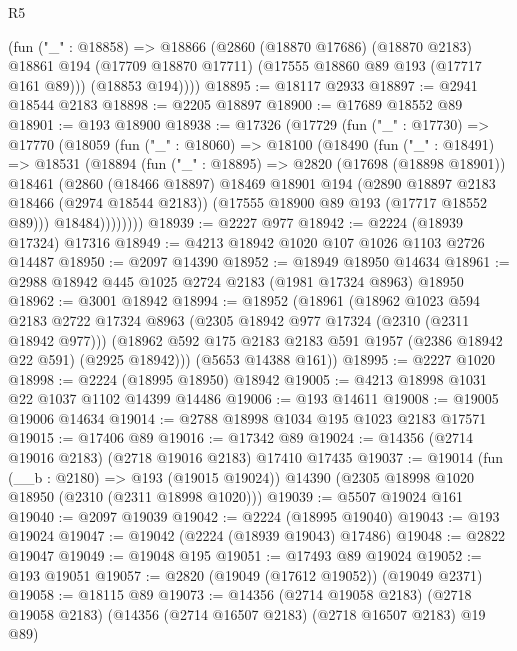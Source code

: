 \begin{lexlean}{R5}
\begin{coremodule}
        (fun ("_" : @18858) =>
        @18866
          (@2860
            (@18870 @17686)
            (@18870 @2183)
            @18861
            @194
            (@17709 @18870 @17711)
            (@17555 @18860 @89 @193 (@17717 @161 @89)))
          (@18853 @194))))
@18895 := @18117 @2933
@18897 := @2941 @18544 @2183
@18898 := @2205 @18897
@18900 := @17689 @18552 @89
@18901 := @193 @18900
@18938 := @17326
    (@17729
      (fun ("_" : @17730) =>
      @17770
        (@18059
          (fun ("_" : @18060) =>
          @18100
            (@18490
              (fun ("_" : @18491) =>
              @18531
                (@18894
                  (fun ("_" : @18895) =>
                  @2820
                    (@17698 (@18898 @18901))
                    @18461
                    (@2860
                      (@18466 @18897)
                      @18469
                      @18901
                      @194
                      (@2890 @18897 @2183 @18466 (@2974 @18544 @2183))
                      (@17555 @18900 @89 @193 (@17717 @18552 @89)))
                    @18484))))))))
@18939 := @2227 @977
@18942 := @2224 (@18939 @17324) @17316
@18949 := @4213 @18942 @1020 @107 @1026 @1103 @2726 @14487
@18950 := @2097 @14390
@18952 := @18949 @18950 @14634
@18961 := @2988 @18942 @445 @1025 @2724 @2183 (@1981 @17324 @8963) @18950
@18962 := @3001 @18942
@18994 := @18952
    (@18961
      (@18962
        @1023
        @594
        @2183
        @2722
        @17324
        @8963
        (@2305 @18942 @977 @17324 (@2310 (@2311 @18942 @977)))
        (@18962 @592 @175 @2183 @2183 @591 @1957 (@2386 @18942 @22 @591) (@2925 @18942)))
      (@5653 @14388 @161))
@18995 := @2227 @1020
@18998 := @2224 (@18995 @18950) @18942
@19005 := @4213 @18998 @1031 @22 @1037 @1102 @14399 @14486
@19006 := @193 @14611
@19008 := @19005 @19006 @14634
@19014 := @2788 @18998 @1034 @195 @1023 @2183 @17571
@19015 := @17406 @89
@19016 := @17342 @89
@19024 := @14356 (@2714 @19016 @2183) (@2718 @19016 @2183) @17410 @17435
@19037 := @19014
    (fun (__b : @2180) => @193 (@19015 @19024))
    @14390
    (@2305 @18998 @1020 @18950 (@2310 (@2311 @18998 @1020)))
@19039 := @5507 @19024 @161
@19040 := @2097 @19039
@19042 := @2224 (@18995 @19040)
@19043 := @193 @19024
@19047 := @19042 (@2224 (@18939 @19043) @17486)
@19048 := @2822 @19047
@19049 := @19048 @195
@19051 := @17493 @89 @19024
@19052 := @193 @19051
@19057 := @2820 (@19049 (@17612 @19052)) (@19049 @2371)
@19058 := @18115 @89
@19073 := @14356
    (@2714 @19058 @2183)
    (@2718 @19058 @2183)
    (@14356 (@2714 @16507 @2183) (@2718 @16507 @2183) @19 @89)

\end{coremodule}
\end{lexlean}
